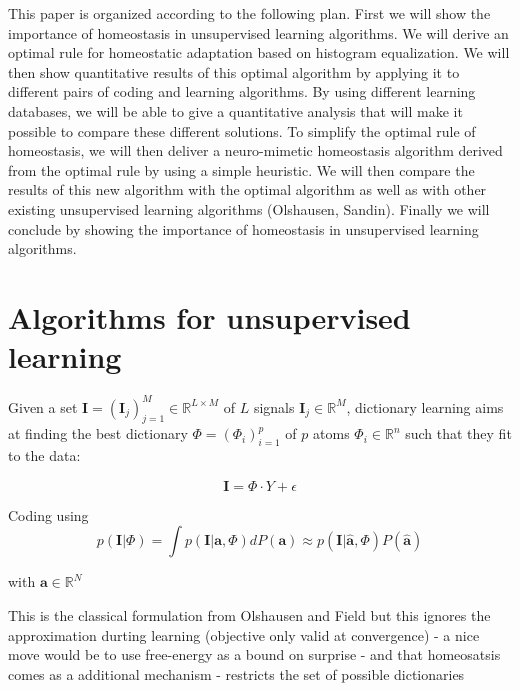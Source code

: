 \documentclass[a4paper, 11pt, draft]{article} %
\newcommand{\RR}{\mathbb{R}}
\newcommand{\coef}{\mathbf{a}} %
\newcommand{\image}{\mathbf{I}} %
\newcommand{\dico}{\Phi} %
\begin{document}
This paper is organized according to the following plan. First we will
show the importance of homeostasis in unsupervised learning algorithms.
We will derive an optimal rule for homeostatic adaptation based on
histogram equalization. We will then show quantitative results of this
optimal algorithm by applying it to different pairs of coding and
learning algorithms. By using different learning databases, we will be
able to give a quantitative analysis that will make it possible to
compare these different solutions. To simplify the optimal rule of
homeostasis, we will then deliver a neuro-mimetic homeostasis algorithm
derived from the optimal rule by using a simple heuristic. We will then
compare the results of this new algorithm with the optimal algorithm as
well as with other existing unsupervised learning algorithms (Olshausen,
Sandin). %
Finally we will conclude by showing the importance
of homeostasis in unsupervised learning algorithms.

\section{Algorithms for unsupervised learning}\label{algorithm}

Given a set $\image = (\image_j)_{j=1}^M \in \RR^{L \times M} $ of $L$ signals
$\image_j \in \RR^M$, dictionary learning aims at finding the best
dictionary $\dico=(\dico_i)_{i=1}^p$ of $p$ atoms $\dico_i \in \RR^n$ such that they fit to the data:

$$ \image = \dico \cdot Y + \epsilon $$

Coding using
$$ p(\image | \dico ) = \int  p(\image | \coef, \dico ) dP(\coef) \approx p(\image | \hat{\coef}, \dico ) P(\hat{\coef}) $$

with $\coef  \in \RR^N$ 

This is the classical formulation from Olshausen and Field but this ignores the approximation durting learning (objective only valid at convergence) - a nice move would be to use free-energy as a bound on surprise - and that homeosatsis comes as a additional mechanism - restricts the set of possible dictionaries
\end{document}

